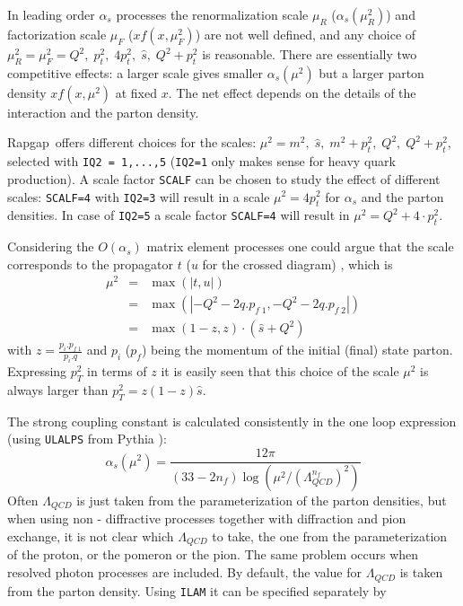 \documentclass[10pt]{article} \usepackage{dina4}
\def\RAPGAP{{\sc Rapgap}}
\def\PYTHIA{{\sc Pythia}}
\begin{document}
In leading order $\alpha_s$ processes
the renormalization scale $\mu_R$ ($\alpha_s (\mu_R^2)$) 
and factorization scale $\mu_F$ ($xf(x,\mu_F^2)$) 
are not well defined, and any choice of 
$\mu_R^2 = \mu_F^2 =Q^2,\;p_t^2,\;4p_t^2,
\;\hat{s},\; Q^2 + p_t^2$ is reasonable. 
There are essentially two competitive effects:
a larger scale gives smaller $\alpha_s(\mu^2)$ but
a larger parton density $xf(x,\mu^2)$ at fixed $x$.
The net effect depends on the
details of the interaction and the parton density. 
\par
\RAPGAP\ offers different choices for the scales:
$\mu^2 = m^2,\;\hat{s},\;m^2+p_t^2,\;Q^2,
\; Q^2 + p_t^2$, selected with \verb+IQ2 = 1,...,5+ (\verb+IQ2=1+ only makes 
sense for heavy quark production). A scale factor 
\verb+SCALF+ can be chosen to study the effect of different scales:
\verb+SCALF=4+ with \verb+IQ2=3+ will result in a scale $\mu^2 = 4 p_t^2 $
 for $\alpha_s$ and the parton densities. 
In case of
\verb+IQ2=5+ a scale factor \verb+SCALF=4+ will result in 
$\mu^2 = Q^2 + 4 \cdot p_t^2 $.
\par
Considering the $O(\alpha_s)$ matrix element processes one could argue 
that the scale corresponds to the propagator $t$ ($u$ for the crossed diagram)
\cite{MEPS},
which is 
\begin{eqnarray}
\mu^2& = & \max(|t,u|) \\
     & = & \max(|-Q^2 - 2 q.p_{f\;1},-Q^2 - 2 q.p_{f\;2}|) \\
     & = & \max(1-z,z) \cdot \left( \hat{s} + Q^2 \right)
\label{scale}
\end{eqnarray}
with $ z = \frac{p_i.p_{f\;1}}{p_i.q}$ and $p_i$ ($p_f$) being the momentum
of the initial (final) state parton. Expressing $p_T^2$ in terms of $z$ it is 
easily seen that this choice of the scale 
$\mu^2$ is always larger than $p_T^2=z(1-z) \hat{s}$.
\par
The strong coupling constant is calculated consistently in the one loop
expression (using \verb+ULALPS+ from \PYTHIA
\cite{Jetseta,Jetsetb,Jetsetc}):
$$ \alpha_s(\mu^2) = 
\frac{12 \pi}{(33-2n_f) \log(\mu^2/(\Lambda^{n_f}_{QCD})^2)} $$
Often $\Lambda_{QCD}$ is just taken from
the parameterization of the parton densities, but when using non - diffractive
processes together with diffraction and pion exchange, it is not clear which
$\Lambda_{QCD}$ to take, the one from the parameterization of the proton, or the
pomeron or the pion. The same problem occurs when resolved photon processes are
included. By default, the value for $\Lambda_{QCD}$ is taken from the parton density. Using \verb+ILAM+ it can be  specified separately by 
\end{document}
